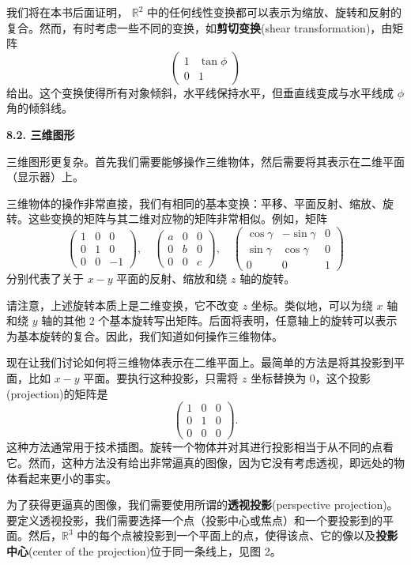 我们将在本书后面证明， $\mathbb{R}^2$ 中的任何线性变换都可以表示为缩放、旋转和反射的复合。然而，有时考虑一些不同的变换，如\textbf{剪切变换}(shear transformation)，由矩阵 
$$\begin{pmatrix} 1 & \tan \phi \\ 0 & 1 \end{pmatrix}$$
给出。这个变换使得所有对象倾斜，水平线保持水平，但垂直线变成与水平线成 $\phi$ 角的倾斜线。

\textbf{8.2. 三维图形}

三维图形更复杂。首先我们需要能够操作三维物体，然后需要将其表示在二维平面（显示器）上。

三维物体的操作非常直接，我们有相同的基本变换：平移、平面反射、缩放、旋转。这些变换的矩阵与其二维对应物的矩阵非常相似。例如，矩阵
$$
\begin{pmatrix} 1 & 0 & 0 \\ 0 & 1 & 0 \\ 0 & 0 & -1 \end{pmatrix}, \quad \begin{pmatrix} a & 0 & 0 \\ 0 & b & 0 \\ 0 & 0 & c \end{pmatrix}, \quad \begin{pmatrix} \cos \gamma & -\sin \gamma & 0 \\ \sin \gamma & \cos \gamma & 0 \\ 0 & 0 & 1 \end{pmatrix}
$$
分别代表了关于 $x-y$ 平面的反射、缩放和绕 $z$ 轴的旋转。

请注意，上述旋转本质上是二维变换，它不改变 $z$ 坐标。类似地，可以为绕 $x$ 轴和绕 $y$ 轴的其他 2 个基本旋转写出矩阵。后面将表明，任意轴上的旋转可以表示为基本旋转的复合。因此，我们知道如何操作三维物体。

现在让我们讨论如何将三维物体表示在二维平面上。最简单的方法是将其投影到平面，比如 $x-y$ 平面。要执行这种投影，只需将 $z$ 坐标替换为 0，这个投影(projection)的矩阵是
$$
\begin{pmatrix} 1 & 0 & 0 \\ 0 & 1 & 0 \\ 0 & 0 & 0 \end{pmatrix}.
$$
这种方法通常用于技术插图。旋转一个物体并对其进行投影相当于从不同的点看它。然而，这种方法没有给出非常逼真的图像，因为它没有考虑透视，即远处的物体看起来更小的事实。

为了获得更逼真的图像，我们需要使用所谓的\textbf{透视投影}(perspective projection)。要定义透视投影，我们需要选择一个点（投影中心或焦点）和一个要投影到的平面。然后，$\mathbb{R}^3$ 中的每个点被投影到一个平面上的点，使得该点、它的像以及\textbf{投影中心}(center of the projection)位于同一条线上，见图 2。

